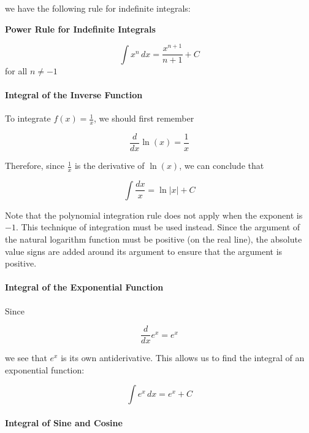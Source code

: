 we have the following rule for indefinite integrals:



\textbf{Power Rule for Indefinite Integrals}  

$$\int x^n \, dx = \frac{x^{n+1}}{n+1} + C$$ for all $n \ne -1$



\paragraph{Integral of the Inverse Function}



To integrate $f(x) = \frac{1}{x}$, we should first remember



$$\frac{d}{dx} \ln(x) = \frac{1}{x}$$



Therefore, since $\frac{1}{x}$ is the derivative of $\ln(x)$, we can conclude that



$$\int \frac{dx}{x} = \ln|x| + C$$



Note that the polynomial integration rule does not apply when the exponent is $-1$. This technique of integration must be used instead. Since the argument of the natural logarithm function must be positive (on the real line), the absolute value signs are added around its argument to ensure that the argument is positive.



\paragraph{Integral of the Exponential Function}



Since



$$\frac{d}{dx} e^x = e^x$$ 



we see that $e^x$ is its own antiderivative. This allows us to find the integral of an exponential function:



$$\int e^x \, dx = e^x + C$$



\paragraph{Integral of Sine and Cosine}



